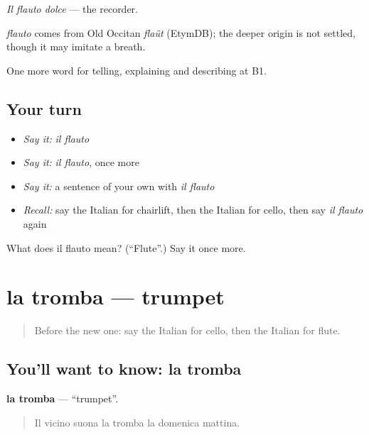\emph{Il flauto dolce} — the recorder.

\begin{cousinweb}
\emph{flauto} comes from Old Occitan \emph{flaüt} (EtymDB); the deeper origin is not settled, though it may imitate a breath.
\end{cousinweb}

\begin{grammarlens}[title={What you've built}]
One more word for telling, explaining and describing at B1.
\end{grammarlens}

\subsection*{Your turn}
\begin{itemize}
\raggedright
  \item \emph{Say it:} \emph{il flauto}
  \item \emph{Say it:} \emph{il flauto}, once more
  \item \emph{Say it:} a sentence of your own with \emph{il flauto}
  \item \emph{Recall:} say the Italian for chairlift, then the Italian for cello, then say \emph{il flauto} again
\end{itemize}

\begin{tcolorbox}[breakable,colback=teal!4,colframe=teal!35!black,title={Before you move on}]
What does il flauto mean? (\textquotedblleft{}Flute\textquotedblright{}.) Say it once more.
\end{tcolorbox}
\section[la tromba]{la tromba — trumpet}

\label{lesson:IT-C516-tromba}



\begin{quote}
Before the new one: say the Italian for cello, then the Italian for flute.
\end{quote}

\subsection*{You'll want to know: la tromba}
\textbf{la tromba} — \textquotedblleft{}trumpet\textquotedblright{}.

\begin{quote}
Il vicino suona la tromba la domenica mattina.
\end{quote}

